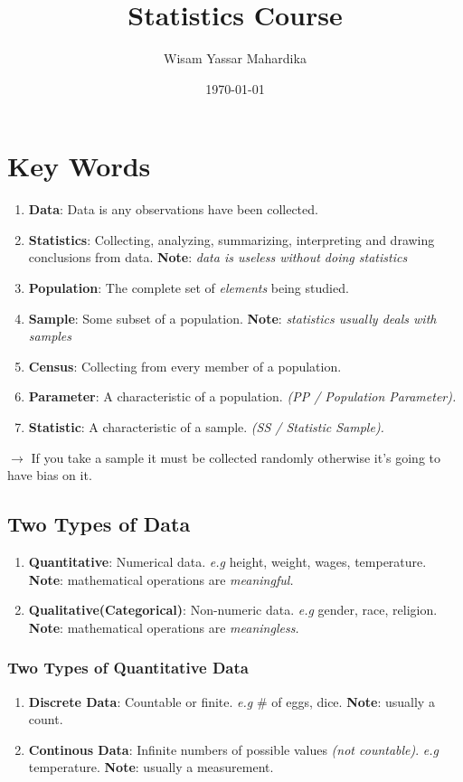 \documentclass{article}
\title{Statistics Course}
\author{Wisam Yassar Mahardika}
\date{\today}
\begin{document}
\maketitle
\clearpage
\tableofcontents
\clearpage
\section{Key Words}
\begin{enumerate}
	\item \textbf{Data}: Data is any observations have been collected.
	\item \textbf{Statistics}: Collecting, analyzing, summarizing, interpreting and drawing conclusions from data. \textbf{Note}: \textit{data is useless without doing statistics}
	\item \textbf{Population}: The complete set of \textit{elements} being studied.
	\item \textbf{Sample}: Some subset of a population. \textbf{Note}: \textit{statistics usually deals with samples}
	\item \textbf{Census}: Collecting from every member of a population.
	\item \textbf{Parameter}: A characteristic of a population. \textit{(PP / Population Parameter).}
\item \textbf{Statistic}: A characteristic of a sample. \textit{(SS / Statistic Sample).}
\end{enumerate}
$ \rightarrow $ If you take a sample it must be collected randomly otherwise it's going to have bias on it.
\subsection{Two Types of Data}
\begin{enumerate}
\item \textbf{Quantitative}: Numerical data. \textit{e.g} height, weight, wages, temperature. \textbf{Note}: mathematical operations are \textit{meaningful.}
	\item \textbf{Qualitative(Categorical)}: Non-numeric data. \textit{e.g} gender, race, religion. \textbf{Note}: mathematical operations are \textit{meaningless.}
\end{enumerate}
\subsubsection{Two Types of Quantitative Data}
\begin{enumerate}
	\item \textbf{Discrete Data}: Countable or finite. \textit{e.g} \# of eggs, dice. \textbf{Note}: usually a count.
	\item \textbf{Continous Data}: Infinite numbers of possible values \textit{(not countable)}. \textit{e.g} temperature. \textbf{Note}: usually a measurement.
\end{enumerate}
\end{document}
